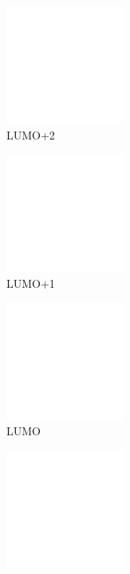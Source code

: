 \begin{figure}[!ht]
 \centering
 \begin{subfigure}[b]{0.31\textwidth}
  \includegraphics[clip=true, width=\textwidth, height=39mm, keepaspectratio]{images/mos/7l+2.eps}
  \caption{LUMO+2}
 \end{subfigure}
  \begin{subfigure}[b]{0.31\textwidth}
  \includegraphics[clip=true, width=\textwidth, height=39mm, keepaspectratio]{images/mos/7l+1.eps}
  \caption{LUMO+1}
 \end{subfigure}
  \begin{subfigure}[b]{0.31\textwidth}
  \includegraphics[clip=true, width=\textwidth, height=39mm, keepaspectratio]{images/mos/7l.eps}
  \caption{LUMO}
 \end{subfigure}
 \begin{subfigure}[b]{0.31\textwidth}
  \includegraphics[clip=true, width=\textwidth, height=39mm, keepaspectratio]{images/mos/7h.eps}

\end{subfigure}
\end{figure}
